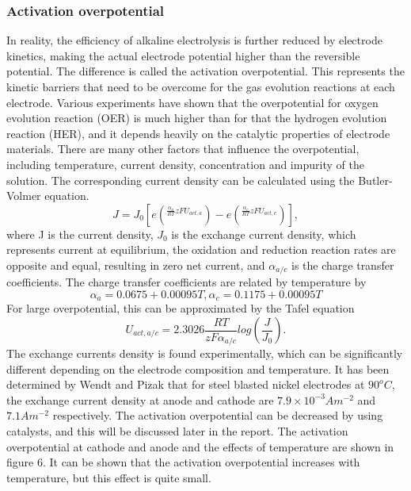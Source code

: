 \subsubsection{Activation overpotential}
In reality, the efficiency of alkaline electrolysis is further reduced by electrode kinetics, making the actual electrode potential higher than the reversible potential. The difference is called the activation overpotential. This represents the kinetic barriers that need to be overcome for the gas evolution reactions at each electrode. Various experiments have shown that the overpotential for oxygen evolution reaction (OER) is much higher than for that the hydrogen evolution reaction (HER), and it depends heavily on the catalytic properties of electrode materials. \cite{activation} There are many other factors that influence the overpotential, including temperature, current density, concentration and impurity of the solution.
The corresponding current density can be calculated using the Butler-Volmer equation. \cite{activation1}
\begin{equation} 
J = J_0 [e(^{\frac{\alpha_a}{RT}zFU_{act,a}}) - e(^{\frac{\alpha_c}{RT}zFU_{act,c}})],
\end{equation}
where J is the current density, $J_0$ is the exchange current density, which represents current at equilibrium, the oxidation and reduction reaction rates are opposite and equal, resulting in zero net current, and  $\alpha_{a/c}$ is the charge transfer coefficients. The charge transfer coefficients are related by temperature by
\begin{equation} 
\alpha_a = 0.0675 + 0.00095T, \alpha_c = 0.1175+0.00095T
\end{equation} 
For large overpotential, this can be approximated by the Tafel equation\cite{activation2} 
\begin{equation} 
U_{act,a/c} = 2.3026 \frac{RT}{zF\alpha_{a/c}} log(\frac{J}{J_0}).
\end{equation}
The exchange currents density is found experimentally, which can be significantly different depending on the electrode composition and temperature. It has been determined by Wendt and Pizak that for steel blasted nickel electrodes at $90^oC$, the exchange current density at anode and cathode are $7.9 \times10^{-3}Am^{-2}$ and $7.1Am^{-2}$ respectively. \cite{activation3} The activation overpotential can be decreased by using catalysts, and this will be discussed later in the report. The activation overpotential at cathode and anode and the effects of temperature are shown in figure 6. It can be shown that the activation overpotential increases with temperature, but this effect is quite small.
